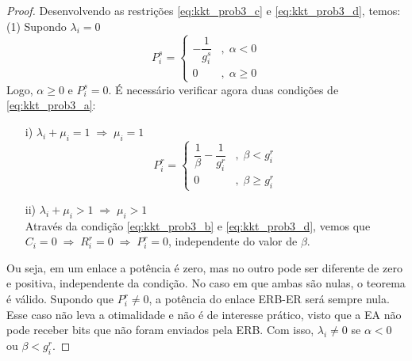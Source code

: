 \begin{proof}
    Desenvolvendo as restrições \eqref{eq:kkt_prob3_c} e \eqref{eq:kkt_prob3_d}, temos:\\
    (1) Supondo $\lambda_i = 0$
    \begin{equation}
    P_i^s=
    \begin{cases}         
    - \dfrac{1}{g_i^s} &,\; \alpha < 0\\
    0 &,\; \alpha \geq 0
    \end{cases}
    \end{equation}
    Logo, $\alpha \geq 0$ e $P_i^s = 0$. É necessário verificar agora duas condições de \eqref{eq:kkt_prob3_a}:
    \begin{itemize}
    \item[i)] $\lambda_i + \mu_i = 1 \;\Rightarrow\; \mu_i = 1$
    \begin{equation}
    P_i^r=
    \begin{cases}         
    \dfrac{1}{\beta} - \dfrac{1}{g_i^r} &,\; \beta < g_i^r\\
    0 &,\; \beta \geq g_i^r
    \end{cases}
    \end{equation}
    \item[ii)] $ \lambda_i + \mu_i > 1\;\Rightarrow\;\mu_i > 1$\\
    Através da condição \eqref{eq:kkt_prob3_b} e \eqref{eq:kkt_prob3_d}, vemos que $C_i = 0\;\Rightarrow\;R_i^r=0\;\Rightarrow\;P_i^r=0$, independente do valor de $\beta$.
    \end{itemize}

    Ou seja, em um enlace a potência é zero, mas no outro pode ser diferente de zero e positiva, independente da condição. No caso em que ambas são nulas, o teorema é válido. Supondo que $P_i^r\neq 0$, a potência do enlace \ac{ERB}-\ac{ER} será sempre nula. Esse caso não leva a otimalidade e não é de interesse prático, visto que a \ac{EA} não pode receber bits que não foram enviados pela \ac{ERB}. Com isso, $\lambda_i \neq 0$ se $\alpha < 0$ ou $\beta < g_i^r$.


\end{proof}
